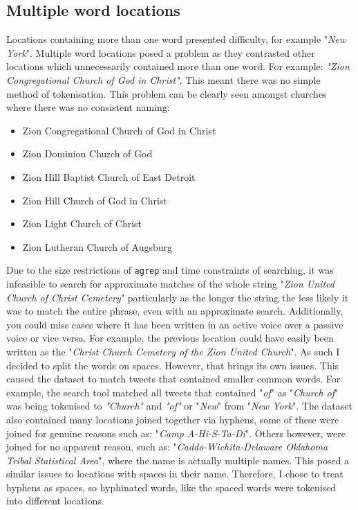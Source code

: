 \documentclass[a4paper]{article}
\begin{document}
\subsection{Multiple word locations}
Locations containing more than one word presented difficulty, for example "\textit{New York}". Multiple word locations posed a problem as they contrasted other locations which unnecessarily contained more than one word. For example: \textit{"Zion Congregational Church of God in Christ"}. This meant there was no simple method of tokenisation. This problem can be clearly seen amongst churches where there was no consistent naming:
\begin{itemize}
  \item Zion Congregational Church of God in Christ
  \item Zion Dominion Church of God
  \item Zion Hill Baptist Church of East Detroit
  \item Zion Hill Church of God in Christ
  \item Zion Light Church of Christ
  \item Zion Lutheran Church of Augsburg
\end{itemize}

Due to the size restrictions of \texttt{agrep} and time constraints of searching, it was infeasible to search for approximate matches of the whole string "\textit{Zion United Church of Christ Cemetery}" particularly as the longer the string the less likely it was to match the entire phrase, even with an approximate search. Additionally, you could miss cases where it has been written in an active voice over a passive voice or vice versa. For example, the previous location could have easily been written as the "\textit{Christ Church Cemetery of the Zion United Church}". As such I decided to split the words on spaces. However, that brings its own issues. This caused the dataset to match tweets that contained smaller common words. For example, the search tool matched all tweets that contained  "\textit{of}" as  "\textit{Church of}"  was being tokenised to \textit{"Church"} and \textit{"of"} or "\textit{New}" from "\textit{New York}".
The dataset also contained many locations joined together via hyphens, some of these were joined for genuine reasons such as: "\textit{Camp A-Hi-S-Ta-Di}". Others however, were joined for no apparent reason, such as: "\textit{Caddo-Wichita-Delaware Oklahoma Tribal Statistical Area}", where the name is actually multiple names. This posed a similar issues to locations with spaces in their name. Therefore, I chose to treat hyphens as spaces, so hyphinated words, like the spaced words were tokenised into different locations.
\end{document}
